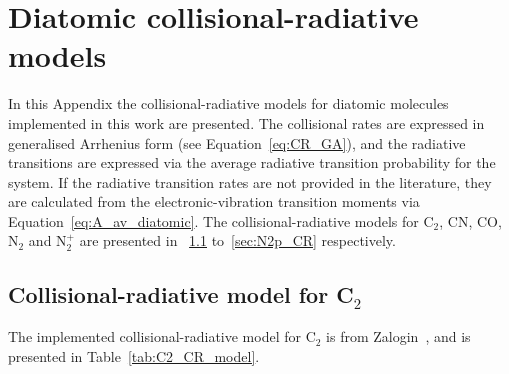 \chapter{Diatomic collisional-radiative models}
\label{app:diatomic_CR_models}

In this Appendix the collisional-radiative models for diatomic molecules implemented in this work are presented.
The collisional rates are expressed in generalised Arrhenius form (see Equation~\ref{eq:CR_GA}), and the radiative transitions are expressed via the average radiative transition probability for the system.
If the radiative transition rates are not provided in the literature, they are calculated from the electronic-vibration transition moments via Equation~\ref{eq:A_av_diatomic}.
The collisional-radiative models for C$_2$, CN, CO, N$_2$ and N$_2^+$ are presented in \textsection~\ref{sec:C2_CR} to~\ref{sec:N2p_CR} respectively.

\clearpage

\section{Collisional-radiative model for C$_2$}
\label{sec:C2_CR}

The implemented collisional-radiative model for C$_2$ is from Zalogin~\cite{zalogin_2001}, and is presented in Table~\ref{tab:C2_CR_model}.

